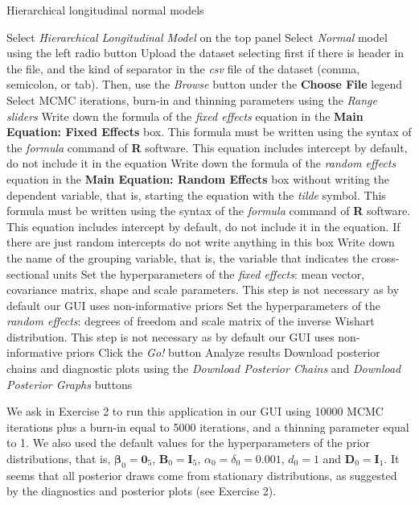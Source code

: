 \begin{algorithm}[h!]
	\caption{Hierarchical longitudinal normal models}\label{alg:HLN}
	\begin{algorithmic}[1]  		 			
		\State Select \textit{Hierarchical Longitudinal Model} on the top panel
		\State Select \textit{Normal} model using the left radio button
		\State Upload the dataset selecting first if there is header in the file, and the kind of separator in the \textit{csv} file of the dataset (comma, semicolon, or tab). Then, use the \textit{Browse} button under the \textbf{Choose File} legend
		\State Select MCMC iterations, burn-in and thinning parameters using the \textit{Range sliders}
		\State Write down the formula of the \textit{fixed effects} equation in the \textbf{Main Equation: Fixed Effects} box. This formula must be written using the syntax of the \textit{formula} command of \textbf{R} software. This equation includes intercept by default, do not include it in the equation
		\State Write down the formula of the \textit{random effects} equation in the \textbf{Main Equation: Random Effects} box without writing the dependent variable, that is, starting the equation with the \textit{tilde} symbol. This formula must be written using the syntax of the \textit{formula} command of \textbf{R} software. This equation includes intercept by default, do not include it in the equation. If there are just random intercepts do not write anything in this box
		\State Write down the name of the grouping variable, that is, the variable that indicates the cross-sectional units 
		\State Set the hyperparameters of the \textit{fixed effects}: mean vector, covariance matrix, shape and scale parameters. This step is not necessary as by default our GUI uses non-informative priors
		\State Set the hyperparameters of the \textit{random effects}: degrees of freedom and scale matrix of the inverse Wishart distribution. This step is not necessary as by default our GUI uses non-informative priors
		\State Click the \textit{Go!} button
		\State Analyze results
		\State Download posterior chains and diagnostic plots using the \textit{Download Posterior Chains} and \textit{Download Posterior Graphs} buttons
	\end{algorithmic} 
\end{algorithm}

We ask in Exercise 2 to run this application in our GUI using 10000 MCMC iterations plus a burn-in equal to 5000 iterations, and a thinning parameter equal to 1. We also used the default values for the hyperparameters of the prior distributions, that is, $\bm{\beta}_0=\bm{0}_5$, $\bm{B}_0=\bm{I}_5$, $\alpha_0=\delta_0=0.001$, $d_0=1$ and $\bm{D}_0=\bm{I}_1$. It seems that all posterior draws come from stationary distributions, as suggested by the diagnostics and posterior plots (see Exercise 2).

